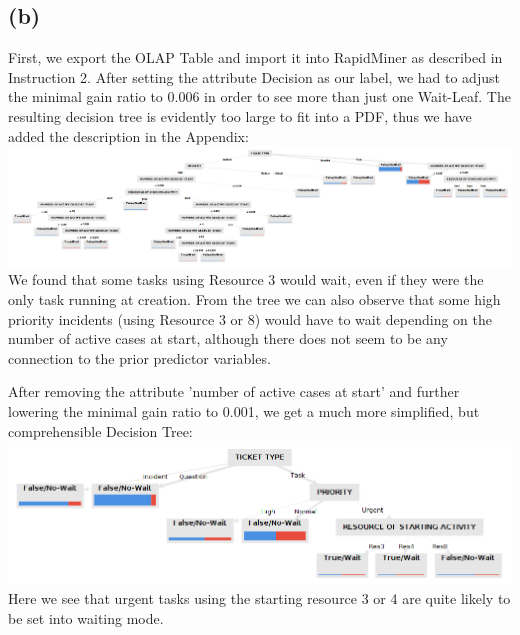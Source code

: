 \documentclass[../../main.tex]{subfiles}
\begin{document}
\subsection*{(b)}
First, we export the OLAP Table and import it into RapidMiner as described in Instruction 2.
After setting the attribute Decision as our label, we had to adjust the minimal gain ratio to 0.006 in order to see more than just one Wait-Leaf. The resulting decision tree is evidently too large to fit into a PDF, thus we have added the description in the Appendix:
\includegraphics[width=\columnwidth]{img/RapidMiner_b_Decision_Tree.png}\\
We found that some tasks using Resource 3 would wait, even if they were the only task running at creation. From the tree we can also observe that some high priority incidents (using Resource 3 or 8) would have to wait depending on the number of active cases at start, although there does not seem to be any connection to the prior predictor variables.

After removing the attribute 'number of active cases at start' and further lowering the minimal gain ratio to 0.001, we get a much more simplified, but comprehensible Decision Tree:
\includegraphics[width=\columnwidth]{img/RapidMiner_b_Decision_Tree_filtered.png}\\
Here we see that urgent tasks using the starting resource 3 or 4 are quite likely to be set into waiting mode.
\end{document}
